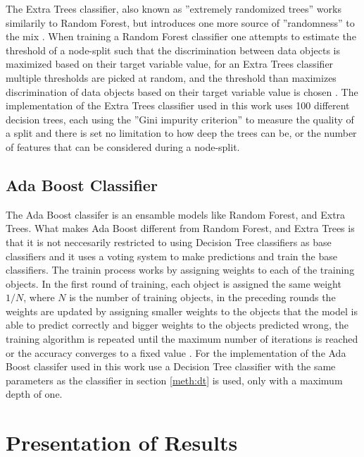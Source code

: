 The Extra Trees classifier, also known as ''extremely randomized trees'' works similarily to Random Forest, but introduces one more source of ''randomness'' to the mix \cite{scikit_learn}. When training a Random Forest classifier one attempts to estimate the threshold of a node-split such that the discrimination between data objects is maximized based on their target variable value, for an Extra Trees classifier multiple thresholds are picked at random, and the threshold than maximizes discrimination of data objects based on their target variable value is chosen \cite{scikit_learn}. The implementation of the Extra Trees classifier used in this work uses 100 different decision trees, each using the ''Gini impurity criterion'' to measure the quality of a split and there is set no limitation to how deep the trees can be, or the number of features that can be considered during a node-split.

\subsection{Ada Boost Classifier}
The Ada Boost classifer is an ensamble models like Random Forest, and Extra Trees. What makes Ada Boost different from Random Forest, and Extra Trees is that it is not neccesarily restricted to using Decision Tree classifiers as base classifiers and it uses a voting system to make predictions and train the base classifiers. The trainin process works by assigning weights to each of the training objects. In the first round of training, each object is assigned the same weight $1/N$, where $N$ is the number of training objects, in the preceding rounds the weights are updated by assigning smaller weights to the objects that the model is able to predict correctly and bigger weights to the objects predicted wrong, the training algorithm is repeated until the maximum number of iterations is reached or the accuracy converges to a fixed value \cite{scikit_learn}. For the implementation of the Ada Boost classifer used in this work use a Decision Tree classifier with the same parameters as the classifier in section \ref{meth:dt} is used, only with a maximum depth of one.

\section{Presentation of Results}